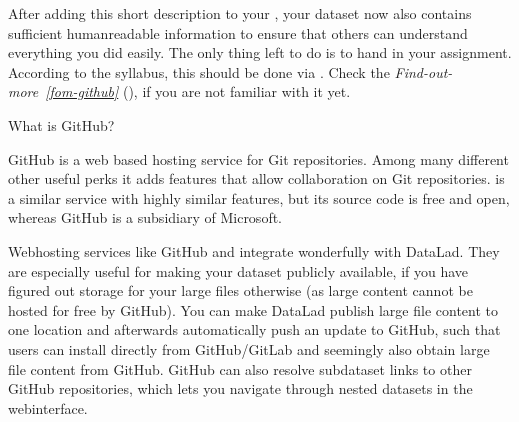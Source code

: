 \sphinxAtStartPar
After adding this short description to your , your dataset now also
contains sufficient human\sphinxhyphen{}readable information to ensure that others can understand
everything you did easily.
The only thing left to do is to hand in your assignment. According to the
syllabus, this should be done via {\hyperref[\detokenize{glossary:term-GitHub}]{}}. Check the \textit{Find-out-more}~{\findoutmoreiconinline}\textit{\ref{fom-github}} {\hyperref[\detokenize{basics/101-130-yodaproject:fom-github}]{}} (), if you are not familiar with it yet.

\ignorespaces \begin{findoutmore}[label={fom-github}, before title={\thetcbcounter\ }, float, floatplacement=p, check odd page=true]{What is GitHub?}
\label{\detokenize{basics/101-130-yodaproject:fom-github}}

\sphinxAtStartPar
GitHub is a web based hosting service for Git repositories. Among many
different other useful perks it adds features that allow collaboration on
Git repositories.  is a similar
service with highly similar features, but its source code is free and open,
whereas GitHub is a subsidiary of Microsoft.

\sphinxAtStartPar
Web\sphinxhyphen{}hosting services like GitHub and {\hyperref[\detokenize{glossary:term-GitLab}]{}} integrate wonderfully with
DataLad. They are especially useful for making your dataset publicly available,
if you have figured out storage for your large files otherwise (as large content
cannot be hosted for free by GitHub). You can make DataLad publish large file content to one location
and afterwards automatically push an update to GitHub, such that
users can install directly from GitHub/GitLab and seemingly also obtain large file
content from GitHub. GitHub can also resolve subdataset links to other GitHub
repositories, which lets you navigate through nested datasets in the web\sphinxhyphen{}interface.

\vspace{1mm}
\vspace{1mm}


\end{findoutmore}
